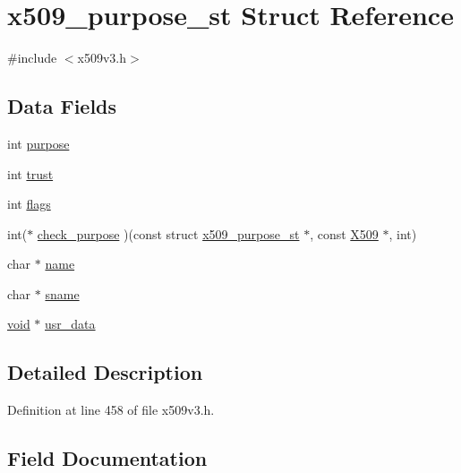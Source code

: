 \hypertarget{structx509__purpose__st}{}\section{x509\+\_\+purpose\+\_\+st Struct Reference}
\label{structx509__purpose__st}


{\ttfamily \#include $<$x509v3.\+h$>$}

\subsection*{Data Fields}
\begin{DoxyCompactItemize}
\item 
int \hyperlink{structx509__purpose__st_aea60aa19f747b78afd1139e406a352f2}{purpose}
\item 
int \hyperlink{structx509__purpose__st_afd5c82d38ea055842dd3ab04fd2e316e}{trust}
\item 
int \hyperlink{structx509__purpose__st_ac8bf36fe0577cba66bccda3a6f7e80a4}{flags}
\item 
int($\ast$ \hyperlink{structx509__purpose__st_a9371a2365586724be07671cc31d70a44}{check\+\_\+purpose} )(const struct \hyperlink{structx509__purpose__st}{x509\+\_\+purpose\+\_\+st} $\ast$, const \hyperlink{crypto_2ossl__typ_8h_a4f666bde6518f95deb3050c54b408416}{X509} $\ast$, int)
\item 
char $\ast$ \hyperlink{structx509__purpose__st_ad547fb8186b526cb1b588daad4334fbe}{name}
\item 
char $\ast$ \hyperlink{structx509__purpose__st_ad763206d033f7b30a351a0a590f1abee}{sname}
\item 
\hyperlink{hw__4758__cca_8h_afad4d591c7931ff6dc5bf69c76c96aa0}{void} $\ast$ \hyperlink{structx509__purpose__st_a95a5cb4558ce78c8ea8f0ca4209945f8}{usr\+\_\+data}
\end{DoxyCompactItemize}


\subsection{Detailed Description}


Definition at line 458 of file x509v3.\+h.



\subsection{Field Documentation}
